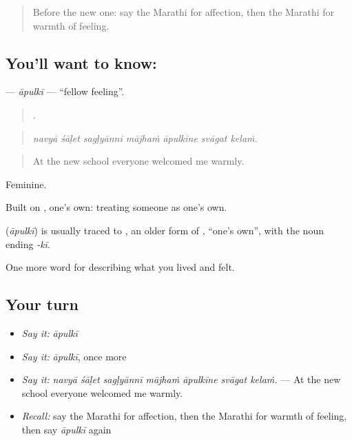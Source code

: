 \label{lesson:MR-C460-apulki}



\begin{quote}
Before the new one: say the Marathi for affection, then the Marathi for warmth of feeling.
\end{quote}

\subsection*{You'll want to know: }
\textbf{} — \emph{āpulkī} — \textquotedblleft{}fellow feeling\textquotedblright{}.

\begin{quote}
      .
\end{quote}

\begin{quote}
\emph{navyā śāḷet sagḷyānnī mājhaṁ āpulkīne svāgat kelaṁ.}
\end{quote}

\begin{quote}
At the new school everyone welcomed me warmly.
\end{quote}

Feminine.

Built on , one's own: treating someone as one's own.

\begin{cousinweb}
\textbf{} (\emph{āpulkī}) is usually traced to , an older form of , \textquotedblleft{}one's own\textquotedblright{}, with the noun ending \emph{-kī}.
\end{cousinweb}

\begin{grammarlens}[title={What you've built}]
One more word for describing what you lived and felt.
\end{grammarlens}

\subsection*{Your turn}
\begin{itemize}
\raggedright
  \item \emph{Say it:} \emph{āpulkī}
  \item \emph{Say it:} \emph{āpulkī}, once more
  \item \emph{Say it:} \emph{navyā śāḷet sagḷyānnī mājhaṁ āpulkīne svāgat kelaṁ.} — At the new school everyone welcomed me warmly.
  \item \emph{Recall:} say the Marathi for affection, then the Marathi for warmth of feeling, then say \emph{āpulkī} again
\end{itemize}

